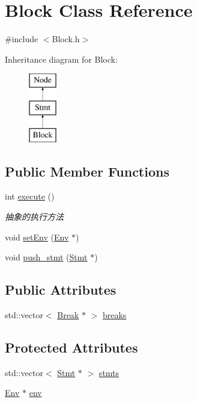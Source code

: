 \hypertarget{class_block}{}\section{Block Class Reference}
\label{class_block}


{\ttfamily \#include $<$Block.\+h$>$}

Inheritance diagram for Block\+:\begin{figure}[H]
\begin{center}
\leavevmode
\includegraphics[height=3.000000cm]{class_block}
\end{center}
\end{figure}
\subsection*{Public Member Functions}
\begin{DoxyCompactItemize}
\item 
int \hyperlink{class_block_a8e03f15df4e43cd6c802341c3bda6b33}{execute} ()
\begin{DoxyCompactList}\small\item\em 抽象的执行方法 \end{DoxyCompactList}\item 
void \hyperlink{class_block_aa48058bd426766898bf31df828b3dac2}{set\+Env} (\hyperlink{class_env}{Env} $\ast$)
\item 
void \hyperlink{class_block_acd012454c035cc7e0d508365752221ff}{push\+\_\+stmt} (\hyperlink{class_stmt}{Stmt} $\ast$)
\end{DoxyCompactItemize}
\subsection*{Public Attributes}
\begin{DoxyCompactItemize}
\item 
std\+::vector$<$ \hyperlink{class_break}{Break} $\ast$ $>$ \hyperlink{class_block_a8cdf287fcbcf92cc429c78b79464b363}{breaks}
\end{DoxyCompactItemize}
\subsection*{Protected Attributes}
\begin{DoxyCompactItemize}
\item 
std\+::vector$<$ \hyperlink{class_stmt}{Stmt} $\ast$ $>$ \hyperlink{class_block_a88f627f956bdc80d9d697f0755130d34}{stmts}
\item 
\hyperlink{class_env}{Env} $\ast$ \hyperlink{class_block_a85617f1e8f9f4b998e9b1ebc4c3b37c4}{env}
\end{DoxyCompactItemize}
